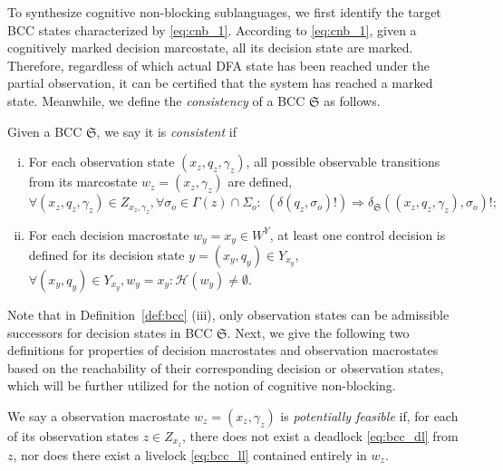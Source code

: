 \documentclass[final,5p,times,twocolumn,authoryear]{elsarticle}
\begin{document}
To synthesize cognitive non-blocking sublanguages, we first identify the target BCC states characterized by \eqref{eq:cnb_1}.
%
According to \eqref{eq:cnb_1}, given a cognitively marked decision marcostate, all its decision state are marked. 
Therefore, regardless of which actual DFA state has been reached under the partial observation, it can be certified that the system has reached a marked state.
%
Meanwhile, we define the \emph{consistency} of a BCC $\mathfrak{S}$ as follows.
%
\begin{definition}\label{def:con_bcc}
Given a BCC $\mathfrak{S}$, we say it is \emph{consistent} if
\begin{enumerate}[(i)]
    \item For each observation state $(x_z, q_z, \gamma_z)$, all possible observable transitions from its marcostate $w_z = (x_z, \gamma_z)$ are defined, 
    $
    \forall (x_z, q_z, \gamma_z) \in Z_{x_z, \gamma_z}, \forall \sigma_o \in \Gamma(z)\cap\Sigma_o:\;
    (\delta(q_z,\sigma_o)!) \Rightarrow \delta_{\mathfrak{S}}((x_z, q_z, \gamma_z), \sigma_o)!;    
    $
    \item For each decision macrostate $w_y = x_y \in W^Y$, at least one control decision is defined for its decision state $y = (x_y, q_y) \in Y_{x_y}$, 
    $
    \forall (x_y, q_y) \in Y_{x_y}, w_y = x_y  : \mathcal{H}(w_y) \neq \emptyset.
    $
\end{enumerate}
\end{definition}
%
Note that in Definition~\ref{def:bcc} (iii), only observation states can be admissible successors for decision states in BCC $\mathfrak{S}$.
%
Next, we give the following two definitions for properties of decision macrostates and observation macrostates based on the reachability of their corresponding decision or observation states, which will be further utilized for the notion of cognitive non-blocking.
%
\begin{definition}\label{def:z_pf}
    We say a observation macrostate $w_z = (x_z, \gamma_z)$ is \emph{potentially feasible} if, for each of its observation states $z \in Z_{x_z}$, there does not exist a deadlock \eqref{eq:bcc_dl} from $z$, nor does there exist a livelock \eqref{eq:bcc_ll} contained entirely in $w_z$.
\end{definition}
\end{document}
